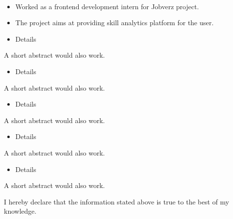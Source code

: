 \documentclass[10pt,a4paper,ragged2e,withhyper]{altacv}
\begin{document}
\begin{paracol}{2}
{}
\\
\smallskip


\divider

\divider


\medskip
\newpage
\switchcolumn
{}

\begin{itemize}
\item Worked as a frontend development intern for Jobverz project.
\item The project aims at providing skill analytics platform for the user. 
\end{itemize}


\begin{itemize}
\item Details
\end{itemize}
A short abstract would also work.

\divider

\begin{itemize}
\item Details
\end{itemize}
A short abstract would also work.

\divider

\begin{itemize}
\item Details
\end{itemize}
A short abstract would also work.

\divider

\begin{itemize}
\item Details
\end{itemize}
A short abstract would also work.

\divider

\begin{itemize}
\item Details
\end{itemize}
A short abstract would also work.

I hereby declare that the information stated above is true to the best of my knowledge.

\end{paracol}
\end{document}
